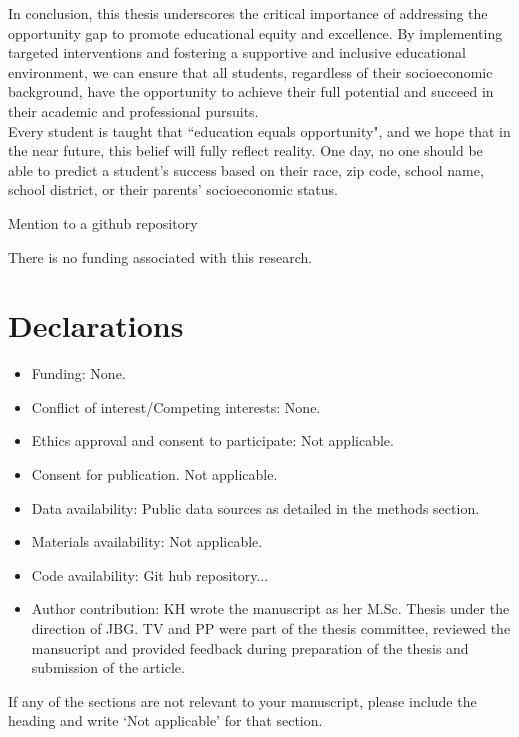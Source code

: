 \documentclass[sn-mathphys-num]{sn-jnl}%
\theoremstyle{thmstyleone}%
\theoremstyle{thmstyletwo}%
\theoremstyle{thmstylethree}%
\begin{document}
{In conclusion, this thesis underscores the critical importance of addressing the opportunity gap to promote educational equity and excellence. By implementing targeted interventions and fostering a supportive and inclusive educational environment, we can ensure that all students, regardless of their socioeconomic background, have the opportunity to achieve their full potential and succeed in their academic and professional pursuits.\\

Every student is taught that ``education equals opportunity", and we hope that in the near future, this belief will fully reflect reality. One day, no one should be able to predict a student's success based on their race, zip code, school name, school district, or their parents' socioeconomic status.

\backmatter


Mention to a github repository


There is no funding associated with this research. 

\section*{Declarations}

\begin{itemize}
\item Funding: None.
\item Conflict of interest/Competing interests: None.
\item Ethics approval and consent to participate: Not applicable.
\item Consent for publication. Not applicable. 
\item Data availability: Public data sources as detailed in the methods section.  
\item Materials availability: Not applicable.
\item Code availability: Git hub repository...
\item Author contribution: KH wrote the manuscript as her M.Sc. Thesis under the direction of JBG. TV and PP were part of the thesis committee, reviewed the mansucript and provided feedback during preparation of the thesis and submission of the article. 
\end{itemize}

\noindent
If any of the sections are not relevant to your manuscript, please include the heading and write `Not applicable' for that section. 

}
\end{document}
